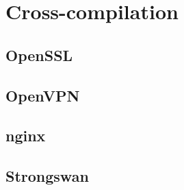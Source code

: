 \chapter{Cross-compilation}

\section{OpenSSL}

\section{OpenVPN}

\section{nginx}

\section{Strongswan}